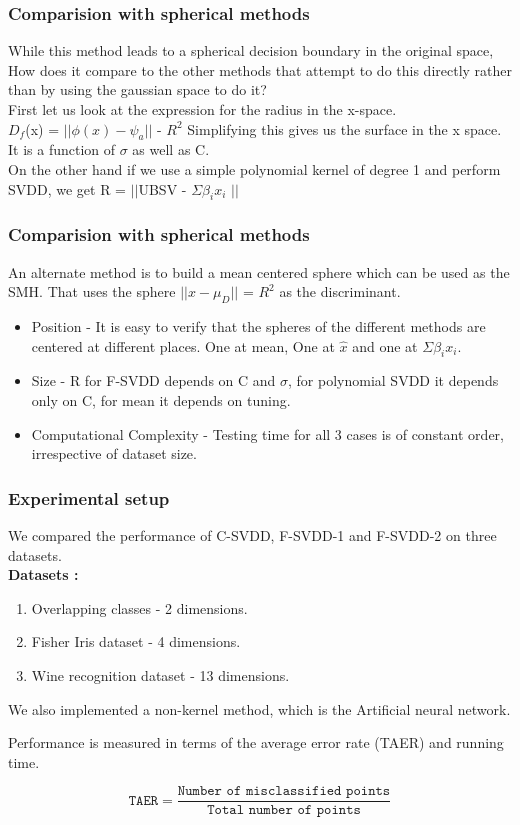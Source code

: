 \documentclass{beamer}
\begin{document}
\begin{frame}
\frametitle{Comparision with spherical methods}
While this method leads to a spherical decision boundary in the original space, How does it compare to the other methods that attempt to do this directly rather than by using the gaussian space to do it?
\\[10pt]
First let us look at the expression for the radius in the x-space.
\\[10pt]
$D_{f}$(x) = $||\phi(x) - \psi_{a}||$ - $R^{2}$
Simplifying this gives us the surface in the x space. It is a function of $\sigma$ as well as C.
\\[5pt]
On the other hand if we use a simple polynomial kernel of degree 1 and perform SVDD, we get R = $||$UBSV - $\Sigma\beta_{i}x_{i}$ $||$
\end{frame}





\begin{frame}
\frametitle{Comparision with spherical methods}
An alternate method is to build a mean centered sphere which can be used as the SMH. 
That uses the sphere $||x - \mu_{D}||$ = $R^{2}$ as the discriminant.
\\[10pt]
\begin{itemize}
\item Position - It is easy to verify that the spheres of the different methods are centered at different places. One at mean, One at $\hat{x}$ and one at $\Sigma\beta_{i}x_{i}$. \\
\item Size - R for F-SVDD depends on C and $\sigma$, for polynomial SVDD it depends only on C, for mean it depends on tuning.
\item Computational Complexity - Testing time for all 3 cases is of constant order, irrespective of dataset size.
\end{itemize}
\end{frame}





\begin{frame}
\frametitle{Experimental setup}
We compared the performance of C-SVDD, F-SVDD-1 and F-SVDD-2 on three datasets. \\[5pt]

\textbf{Datasets :}
\begin{enumerate}
\item Overlapping classes - 2 dimensions.
\item Fisher Iris dataset - 4 dimensions.
\item Wine recognition dataset - 13 dimensions.
\end{enumerate}

We also implemented a non-kernel method, which is the Artificial neural network.

Performance is measured in terms of the average error rate (TAER) and running time.

\[ \texttt{TAER} = \frac{\texttt{Number of misclassified points}}{\texttt{Total number of points}} \]


\end{frame}
\end{document}
